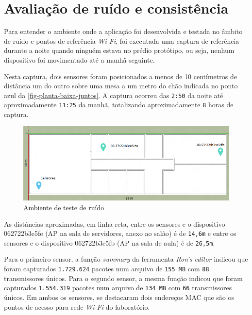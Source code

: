 \section{Avaliação de ruído e consistência}
\label{sec:teste-ruido}

Para entender o ambiente onde a aplicação foi desenvolvida e testada no âmbito
de ruído e pontos de referência \emph{Wi-Fi}, foi executada uma captura de referência
durante a noite quando ninguém estava no prédio protótipo, ou seja, nenhum
dispositivo foi movimentado até a manhã seguinte.

Nesta captura, dois sensores foram posicionados a menos de 10
centímetros de distância um do outro sobre uma mesa a um metro do chão indicada no ponto
azul da \autoref{fig-planta-baixa-juntos}. A captura
ocorreu das \texttt{2:50} da noite até aproximadamente \texttt{11:25} da manhã, totalizando
aproximadamente \texttt{8} horas de captura.

\begin{figure}[htb]
	\caption{\label{fig-planta-baixa-juntos}Ambiente de teste de ruído}
	\begin{center}
		\includegraphics[width=1\textwidth]{060-testes/data-analisis/planta-baixa-ruido.png}
	\end{center}
\end{figure}

As distâncias aproximadas, em linha reta, entre os sensores e o dispositivo
062722b3e5fe (AP na sala de servidores, anexo ao salão) é de
\texttt{14,6m} e entre os sensores e o dispositivo
062722b3e5fb (AP na sala de aula) é de \texttt{26,5m}.

Para o primeiro sensor, a função \emph{summary} da ferramenta \emph{Ron’s editor} indicou que foram capturados \texttt{1.729.624}
pacotes num arquivo de \texttt{155 MB} com \texttt{88} transmissores únicos.
Para o segundo sensor, a mesma função indicou que foram capturados \texttt{1.554.319}
pacotes num arquivo de \texttt{134 MB} com \texttt{66} transmissores únicos.
Em ambos os sensores, se destacaram dois endereços MAC que são os pontos de
acesso para rede \emph{Wi-Fi} do laboratório.

